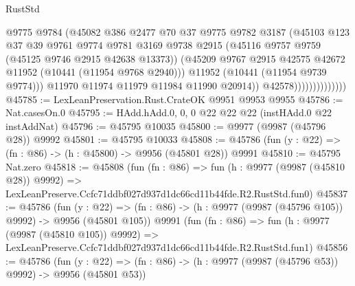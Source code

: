 \begin{lexlean}{RustStd}
\begin{coremodule}
                                  @9775
                                  @9784
                                  (@45082
                                    @386
                                    @2477
                                    @70
                                    @37
                                    @9775
                                    @9782
                                    @3187
                                    (@45103
                                      @123
                                      @37
                                      @39
                                      @9761
                                      @9774
                                      @9781
                                      @3169
                                      @9738
                                      @2915
                                      (@45116 @9757 @9759 (@45125 @9746 @2915 @42638 @13373))
                                      (@45209
                                        @9767
                                        @2915
                                        @42575
                                        @42672
                                        @11952
                                        (@10441 (@11954 @9768 @2940)))
                                      @11952
                                      (@10441 (@11954 @9739 @9774)))
                                    @11970
                                    @11974
                                    @11979
                                    @11984
                                    @11990
                                    @20914))
                                @42578))))))))))))))
@45785 := LexLeanPreservation.Rust.CrateOK @9951 @9953 @9955
@45786 := Nat.casesOn.{0}
@45795 := HAdd.hAdd.{0, 0, 0} @22 @22 @22 (instHAdd.{0} @22 instAddNat)
@45796 := @45795 @10035
@45800 := @9977 (@9987 (@45796 @28)) @9992
@45801 := @45795 @10033
@45808 := @45786 (fun (y : @22) => (fn : @86) -> (h : @45800) -> @9956 (@45801 @28)) @9991
@45810 := @45795 Nat.zero
@45818 := @45808
    (fun (fn : @86) =>
    fun (h : @9977 (@9987 (@45810 @28)) @9992) =>
    LexLeanPreserve.Ccfc71ddbf027d937d1dc66cd11b44fde.R2.RustStd.fun0)
@45837 := @45786
    (fun (y : @22) => (fn : @86) -> (h : @9977 (@9987 (@45796 @105)) @9992) -> @9956 (@45801 @105))
    @9991
    (fun (fn : @86) =>
    fun (h : @9977 (@9987 (@45810 @105)) @9992) =>
    LexLeanPreserve.Ccfc71ddbf027d937d1dc66cd11b44fde.R2.RustStd.fun1)
@45856 := @45786
    (fun (y : @22) => (fn : @86) -> (h : @9977 (@9987 (@45796 @53)) @9992) -> @9956 (@45801 @53))

\end{coremodule}
\end{lexlean}
